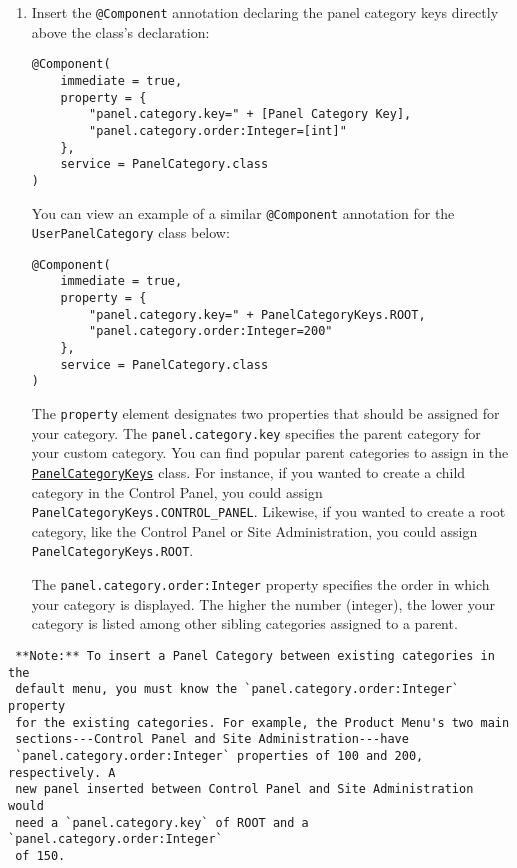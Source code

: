 \begin{enumerate}
\def\labelenumi{\arabic{enumi}.}
\item
  Insert the \texttt{@Component} annotation declaring the panel category
  keys directly above the class's declaration:

\begin{verbatim}
@Component(
    immediate = true,
    property = {
        "panel.category.key=" + [Panel Category Key],
        "panel.category.order:Integer=[int]"
    },
    service = PanelCategory.class
)
\end{verbatim}

  You can view an example of a similar \texttt{@Component} annotation
  for the \texttt{UserPanelCategory} class below:

\begin{verbatim}
@Component(
    immediate = true,
    property = {
        "panel.category.key=" + PanelCategoryKeys.ROOT,
        "panel.category.order:Integer=200"
    },
    service = PanelCategory.class
)
\end{verbatim}

  The \texttt{property} element designates two properties that should be
  assigned for your category. The \texttt{panel.category.key} specifies
  the parent category for your custom category. You can find popular
  parent categories to assign in the
  \href{https://docs.liferay.com/dxp/apps/application-list/latest/javadocs/com/liferay/application/list/PanelCategoryKeys.html}{\texttt{PanelCategoryKeys}}
  class. For instance, if you wanted to create a child category in the
  Control Panel, you could assign
  \texttt{PanelCategoryKeys.CONTROL\_PANEL}. Likewise, if you wanted to
  create a root category, like the Control Panel or Site Administration,
  you could assign \texttt{PanelCategoryKeys.ROOT}.

  The \texttt{panel.category.order:Integer} property specifies the order
  in which your category is displayed. The higher the number (integer),
  the lower your category is listed among other sibling categories
  assigned to a parent.
\end{enumerate}

\noindent\hrulefill

\begin{verbatim}
 **Note:** To insert a Panel Category between existing categories in the
 default menu, you must know the `panel.category.order:Integer` property
 for the existing categories. For example, the Product Menu's two main
 sections---Control Panel and Site Administration---have
 `panel.category.order:Integer` properties of 100 and 200, respectively. A
 new panel inserted between Control Panel and Site Administration would
 need a `panel.category.key` of ROOT and a `panel.category.order:Integer`
 of 150.
\end{verbatim}

